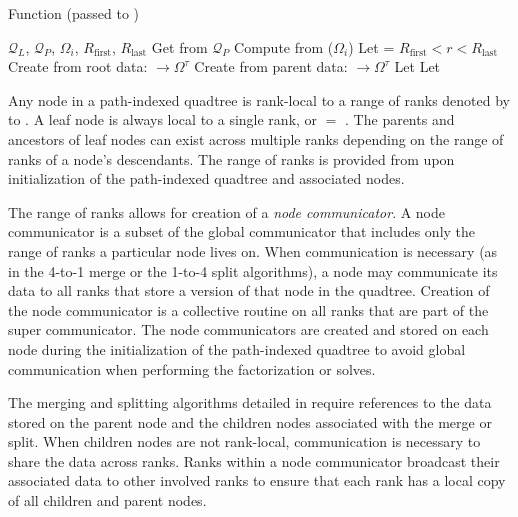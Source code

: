 \begin{algorithm}
    \caption{ Function (passed to )}
    \begin{algorithmic}[0]
        \Require $\mathcal{Q}_{L}$, $\mathcal{Q}_{P}$, $\Omega_i$, $R_{\text{first}}$, $R_{\text{last}}$
        \State Get  from $\mathcal{Q}_{P}$
        \State Compute  from ($\Omega_i$)
        \State Let  = $R_{\text{first}} < r < R_{\text{last}}$
                \State Create  from root data:  $\rightarrow \Omega^{\tau}$
            \Else
                \State Create  from parent data:  $\rightarrow \Omega^{\tau}$
            \EndIf
            \State Let 
        \Else
            \State Let 
        \EndIf
    \end{algorithmic}
    \label{alg:p4est_search_all_callback}
\end{algorithm}

Any node in a path-indexed quadtree is rank-local to a range of ranks denoted by \rfirst to \rlast. A leaf node is always local to a single rank, or \rfirst $=$ \rlast. The parents and ancestors of leaf nodes can exist across multiple ranks depending on the range of ranks of a node's descendants. The range of ranks is provided from \pforest upon initialization of the path-indexed quadtree and associated nodes.

The range of ranks allows for creation of a {\em node communicator}. A node communicator is a subset of the global communicator that includes only the range of ranks a particular node lives on. When communication is necessary (as in the 4-to-1 merge or the 1-to-4 split algorithms), a node may communicate its data to all ranks that store a version of that node in the quadtree. Creation of the node communicator is a collective routine on all ranks that are part of the super communicator. The node communicators are created and stored on each node during the initialization of the path-indexed quadtree to avoid global communication when performing the factorization or solves.

The merging and splitting algorithms detailed in  require references to the data stored on the parent node and the children nodes associated with the merge or split. When children nodes are not rank-local, communication is necessary to share the data across ranks. Ranks within a node communicator broadcast their associated data to other involved ranks to ensure that each rank has a local copy of all children and parent nodes.

